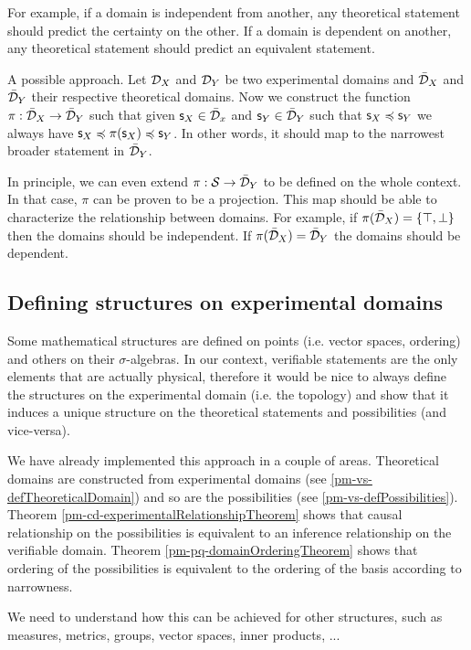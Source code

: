 \documentclass[11pt,letterpaper,fleqn]{memoir} %
\begin{document}
For example, if a domain is independent from another, any theoretical statement should predict the certainty on the other. If a domain is dependent on another, any theoretical statement should predict an equivalent statement.

A possible approach. Let $\mathcal{D}_X$ and $\mathcal{D}_Y$ be two experimental domains and $\bar{\mathcal{D}}_X$ and $\bar{\mathcal{D}}_Y$ their respective theoretical domains. Now we construct the function $\pi: \bar{\mathcal{D}}_X \to \bar{\mathcal{D}}_Y$ such that given $\mathsf{s}_X \in \bar{\mathcal{D}}_x$ and $\mathsf{s}_Y \in \bar{\mathcal{D}}_Y$ such that $\mathsf{s}_X \preccurlyeq \mathsf{s}_Y$ we always have $\mathsf{s}_X \preccurlyeq \pi(\mathsf{s}_X) \preccurlyeq \mathsf{s}_Y$. In other words, it should map to the narrowest broader statement in $\bar{\mathcal{D}}_Y$.

In principle, we can even extend $\pi : \mathcal{S} \to \bar{\mathcal{D}}_Y$ to be defined on the whole context. In that case, $\pi$ can be proven to be a projection. This map should be able to characterize the relationship between domains. For example, if $\pi(\bar{\mathcal{D}}_X) = \{ \top, \bot \}$ then the domains should be independent. If $\pi(\bar{\mathcal{D}}_X) = \bar{\mathcal{D}}_Y$ the domains should be dependent.

\subsection{Defining structures on experimental domains}

Some mathematical structures are defined on points (i.e. vector spaces, ordering) and others on their $\sigma$-algebras. In our context, verifiable statements are the only elements that are actually physical, therefore it would be nice to always define the structures on the experimental domain (i.e. the topology) and show that it induces a unique structure on the theoretical statements and possibilities (and vice-versa).

We have already implemented this approach in a couple of areas. Theoretical domains are constructed from experimental domains (see \ref{pm-vs-defTheoreticalDomain}) and so are the possibilities (see \ref{pm-vs-defPossibilities}). Theorem \ref{pm-cd-experimentalRelationshipTheorem} shows that causal relationship on the possibilities is equivalent to an inference relationship on the verifiable domain. Theorem \ref{pm-pq-domainOrderingTheorem} shows that ordering of the possibilities is equivalent to the ordering of the basis according to narrowness.

We need to understand how this can be achieved for other structures, such as measures, metrics, groups, vector spaces, inner products, ...
\end{document}
